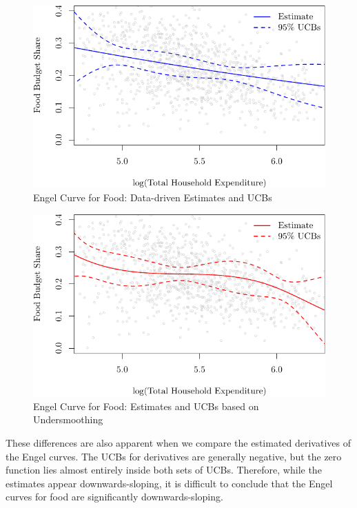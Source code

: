 \documentclass[
]{jss}
\begin{document}
\begin{figure}
\centering
\includegraphics{npiv_files/figure-latex/food-dd-1.pdf}
\caption{Engel Curve for Food: Data-driven Estimates and UCBs}
\end{figure}

\begin{figure}
\centering
\includegraphics{npiv_files/figure-latex/food-det-1.pdf}
\caption{Engel Curve for Food: Estimates and UCBs based on
Undersmoothing}
\end{figure}

These differences are also apparent when we compare the estimated
derivatives of the Engel curves. The UCBs for derivatives are generally
negative, but the zero function lies almost entirely inside both sets of
UCBs. Therefore, while the estimates appear downwards-sloping, it is
difficult to conclude that the Engel curves for food are significantly
downwards-sloping.
\end{document}

